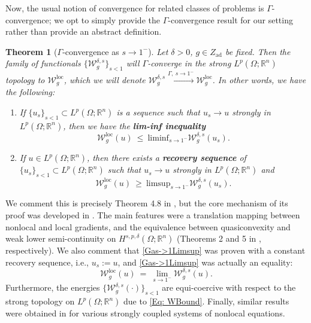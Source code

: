 \documentclass[11pt, reqno]{amsart}   	%
\theoremstyle{plain}
\numberwithin{equation}{section}
\newtheorem{theorem}[thm]{Theorem}
\def\de{\delta}
\def\Ga{\Gamma}
\def\Om{\Omega}
\def\R{\mathbb{R}}
\def\liminf{\text{liminf}}
\def\limsup{\text{limsup}}
\def\loc{\text{loc}}
\begin{document}
Now, the usual notion of convergence for related classes of problems is $\Ga$-convergence; we opt to simply provide the $\Ga$-convergence result for our setting rather than provide an abstract definition.

\begin{theorem}[$\Ga$-convergence as $s \rightarrow 1^-$]\label{Thm: Gas->1Theorem}
	Let $\de > 0$, $g \in Z_{\text{ad}}$ be fixed. Then the family of functionals $\{\mathcal{W}^{\de, s}_g\}_{s < 1}$ will $\Ga$-converge in the strong $L^p(\Om; \R^n)$ topology to $\mathcal{W}^{\loc}_g$, which we will denote $\mathcal{W}^{\de, s}_g \xrightarrow{\Ga, \ s \rightarrow 1^-} \mathcal{W}^{\loc}_g$. In other words, we have the following:
	\begin{enumerate}[label=\textbf{GCs\arabic*}]
		\item\label{GCs1} If $\{u_s\}_{s < 1} \subset L^p(\Om; \R^n)$ is a sequence such that $u_s \rightarrow u$ strongly in $L^p(\Om; \R^n)$, then we have the \textbf{lim-inf inequality}
		\begin{equation}\label{Gas->1Liminf}
			\mathcal{W}^{\loc}_g(u) \ \leq \ \liminf_{s \rightarrow 1^-}\mathcal{W}^{\de, s}_g(u_s).
		\end{equation}
		\item\label{GCs2} If $u \in L^p(\Om; \R^n)$, then there exists a \textbf{recovery sequence} of $\{u_s\}_{s < 1} \subset L^p(\Om; \R^n)$ such that $u_s \rightarrow u$ strongly in $L^p(\Om; \R^n)$ and
		\begin{equation}\label{Gas->1Limsup}
			\mathcal{W}^{\loc}_g(u) \ \geq \ \limsup_{s \to 1^-} \mathcal{W}^{\de, s}_g(u_s).
		\end{equation}
	\end{enumerate}
\end{theorem}
We comment this is precisely Theorem 4.8 in \cite{cueto2026localization}, but the core mechanism of its proof was developed in \cite[Theorem 7]{cueto2023variational}. The main features were a translation mapping between nonlocal and local gradients, and the equivalence between quasiconvexity and weak lower semi-continuity on $H^{s, p, \de}(\Om; \R^n)$ (Theorems 2 and 5 in \cite{cueto2023variational}, respectively). We also comment that \eqref{Gas->1Limsup} was proven with a constant recovery sequence, i.e., $u_s := u$, and \eqref{Gas->1Limsup} was actually an equality:
\begin{equation}\label{Gas->1Limeq}
    \mathcal{W}^{\loc}_g(u) \ = \ \lim_{s \to 1^-} \mathcal{W}^{\de, s}_g(u).
\end{equation}
Furthermore, the energies $\{\mathcal{W}^{\de, s}_g(\cdot)\}_{s < 1}$ are equi-coercive with respect to the strong topology on $L^p(\Om; \R^n)$ due to \eqref{Eq: WBound}. Finally, similar results were obtained in \cite{bellido2020bond, bellido2021gamma, mengesha2015variational} for various strongly coupled systems of nonlocal equations.
\end{document}
